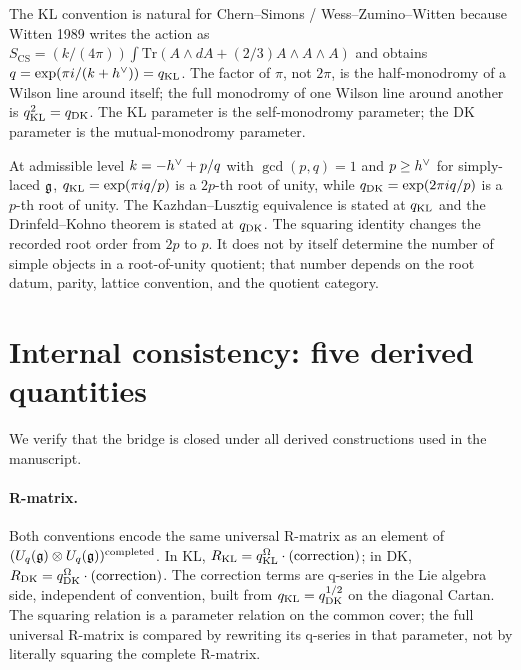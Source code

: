 \begin{remark}
\label{rem:q-bridge-cs}
The KL convention is natural for Chern--Simons / Wess--Zumino--Witten
because Witten 1989 writes the action as $S_{\mathrm{CS}} =
(k/(4\pi)) \int \mathrm{Tr}(A \wedge dA + (2/3) A \wedge A \wedge
A)$ and obtains $q = \exp(\pi i / (k + h^{\vee})) = q_{\mathrm{KL}}$. The factor
of $\pi$, not $2\pi$, is the half-monodromy of a Wilson line
around itself; the full monodromy of one Wilson line around
another is $q_{\mathrm{KL}}^{2} = q_{\mathrm{DK}}$. The KL parameter is the
self-monodromy parameter; the DK parameter is the
mutual-monodromy parameter.
\end{remark}

\begin{remark}
\label{rem:q-bridge-periodicity}
At admissible level $k = -h^{\vee} + p/q$ with $\gcd(p, q) = 1$ and
$p \geq h^{\vee}$ for simply-laced $\mathfrak{g}$, $q_{\mathrm{KL}} = \exp(\pi i q/p)$
is a $2p$-th root of unity, while $q_{\mathrm{DK}} = \exp(2\pi i q/p)$
is a $p$-th root of unity. The Kazhdan--Lusztig equivalence is
stated at $q_{\mathrm{KL}}$ and the Drinfeld--Kohno theorem is stated at
$q_{\mathrm{DK}}$. The squaring identity changes the recorded root order
from $2p$ to $p$. It does not by itself determine the number of
simple objects in a root-of-unity quotient; that number depends on
the root datum, parity, lattice convention, and the quotient category.
\end{remark}

\section{Internal consistency: five derived quantities}
\label{sec:q-bridge-consistency}

We verify that the bridge is closed under all derived
constructions used in the manuscript.

\paragraph{R-matrix.}
Both conventions encode the same universal R-matrix as an element
of $(U_{q}(\mathfrak{g}) \otimes U_{q}(\mathfrak{g}))^{\mathrm{completed}}$. In KL,
$R_{\mathrm{KL}} = q_{\mathrm{KL}}^{\Omega} \cdot (\mathrm{correction})$; in DK,
$R_{\mathrm{DK}} = q_{\mathrm{DK}}^{\Omega} \cdot (\mathrm{correction})$. The
correction terms are q-series in the Lie algebra side, independent
of convention, built from $q_{\mathrm{KL}} = q_{\mathrm{DK}}^{1/2}$ on the
diagonal Cartan. The squaring relation is a parameter relation on
the common cover; the full universal R-matrix is compared by
rewriting its q-series in that parameter, not by literally squaring
the complete R-matrix.


